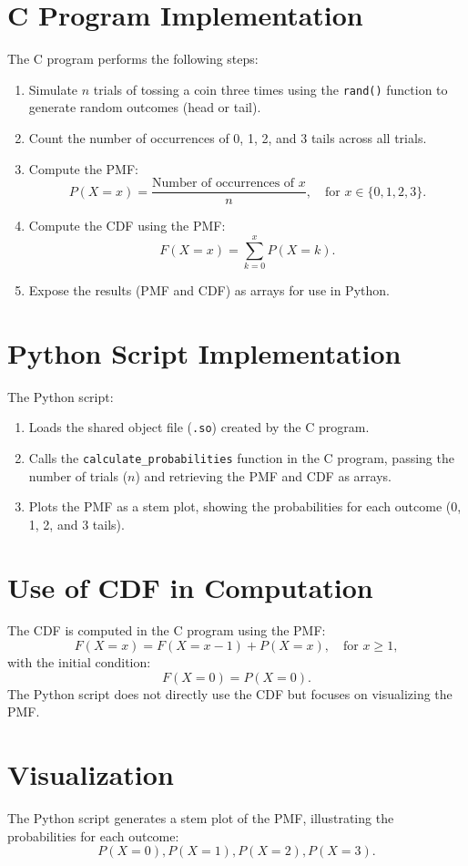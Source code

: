\documentclass[journal]{IEEEtran}
\begin{document}
\section*{C Program Implementation}
The C program performs the following steps:
\begin{enumerate}
    \item Simulate \( n \) trials of tossing a coin three times using the \texttt{rand()} function to generate random outcomes (head or tail).
    \item Count the number of occurrences of 0, 1, 2, and 3 tails across all trials.
    \item Compute the PMF:
    \[
    P(X = x) = \frac{\text{Number of occurrences of } x}{n}, \quad \text{for } x \in \{0, 1, 2, 3\}.
    \]
    \item Compute the CDF using the PMF:
    \[
    F(X = x) = \sum_{k=0}^{x} P(X = k).
    \]
    \item Expose the results (PMF and CDF) as arrays for use in Python.
\end{enumerate}

\section*{Python Script Implementation}
The Python script:
\begin{enumerate}
    \item Loads the shared object file (\texttt{.so}) created by the C program.
    \item Calls the \texttt{calculate\_probabilities} function in the C program, passing the number of trials (\( n \)) and retrieving the PMF and CDF as arrays.
    \item Plots the PMF as a stem plot, showing the probabilities for each outcome (0, 1, 2, and 3 tails).
\end{enumerate}

\section*{Use of CDF in Computation}
The CDF is computed in the C program using the PMF:
\[
F(X = x) = F(X = x-1) + P(X = x), \quad \text{for } x \geq 1,
\]
with the initial condition:
\[
F(X = 0) = P(X = 0).
\]
The Python script does not directly use the CDF but focuses on visualizing the PMF.

\section*{Visualization}
The Python script generates a stem plot of the PMF, illustrating the probabilities for each outcome:
\[
P(X = 0), P(X = 1), P(X = 2), P(X = 3).
\]
\end{document}

